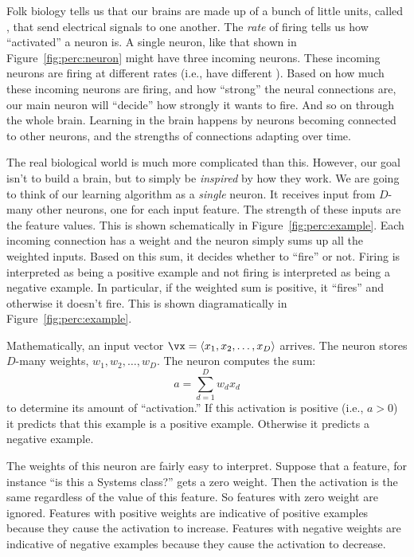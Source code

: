 
Folk biology tells us that our brains are made up of a bunch of little
units, called , that send electrical signals to one
another.  The \emph{rate} of firing tells us how ``activated'' a
neuron is.  A single neuron, like that shown in
Figure~\ref{fig:perc:neuron} might have three incoming neurons.  These
incoming neurons are firing at different rates (i.e., have different
).  Based on how much these incoming neurons are
firing, and how ``strong'' the neural connections are, our main neuron
will ``decide'' how strongly it wants to fire.  And so on through the
whole brain.  Learning in the brain happens by neurons becoming
connected to other neurons, and the strengths of connections adapting
over time.


The real biological world is much more complicated than this.
However, our goal isn't to build a brain, but to simply be
\emph{inspired} by how they work.  We are going to think of our
learning algorithm as a \emph{single} neuron.  It receives input from
$D$-many other neurons, one for each input feature.  The strength of
these inputs are the feature values.  This is shown schematically in
Figure~\ref{fig:perc:example}.  Each incoming connection has a weight
and the neuron simply sums up all the weighted inputs.  Based on this
sum, it decides whether to ``fire'' or not.  Firing is interpreted as
being a positive example and not firing is interpreted as being a
negative example.  In particular, if the weighted sum is positive, it
``fires'' and otherwise it doesn't fire.  This is shown
diagramatically in Figure~\ref{fig:perc:example}.

Mathematically, an input vector $\vx = \langle x_1, x_2, \dots, x_D
\rangle$ arrives.  The neuron stores $D$-many weights, $w_1, w_2,
\dots, w_D$.  The neuron computes the sum:
\begin{equation} \label{eq:perc:sum}
a = \sum_{d=1}^D w_d x_d
\end{equation}
to determine its amount of ``activation.''  If this activation is
positive (i.e., $a > 0$) it predicts that this example is a positive
example.  Otherwise it predicts a negative example.

The weights of this neuron are fairly easy to interpret.  Suppose that
a feature, for instance ``is this a Systems class?'' gets a zero
weight.  Then the activation is the same regardless of the value of
this feature.  So features with zero weight are ignored.  Features
with positive weights are indicative of positive examples because they
cause the activation to increase.  Features with negative weights are
indicative of negative examples because they cause the activation to
decrease.

